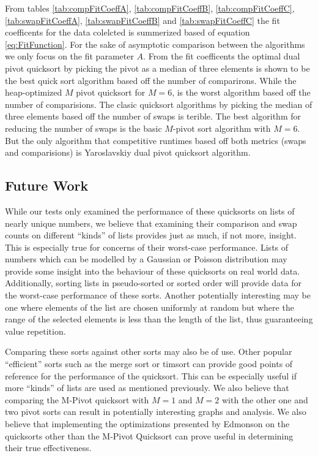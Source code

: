 		From tables \ref{tab:compFitCoeffA}, \ref{tab:compFitCoeffB}, \ref{tab:compFitCoeffC}, \ref{tab:swapFitCoeffA}, \ref{tab:swapFitCoeffB} and \ref{tab:swapFitCoeffC} the fit coefficents for the data colelcted is summerized based of equation \ref{eq:FitFunction}. For the sake of asymptotic comparison between the algorithms we only focus on the fit parameter $A$. From the fit coefficents the optimal dual pivot quicksort by picking the pivot as a median of three elements is shown to be the best quick sort algorithm based off the number of comparirons. While the heap-optimized $M$ pivot quicksort for $M=6$, is the worst algorithm based off the number of comparisions. The clasic quicksort algorithms by picking the median of three elements based off the number of swaps is terible. The best algorithm for reducing the number of swaps is the basic $M$-pivot sort algorithm with $M=6$. But the only algorithm that competitive runtimes based off both metrics (swaps and comparisions) is Yaroslavskiy dual pivot quicksort algorithm.
		

	\subsection{Future Work}
		\label{subsec:FutureStuff}
		While our tests only examined the performance of these quicksorts on lists of nearly unique numbers, we believe that examining their comparison and swap counts on different ``kinds'' of lists provides just as much, if not more, insight. This is especially true for concerns of their worst-case performance. Lists of numbers which can be modelled by a Gaussian or Poisson distribution may provide some insight into the behaviour of these quicksorts on real world data. Additionally, sorting lists in pseudo-sorted or sorted order will provide data for the worst-case performance of these sorts. Another potentially interesting may be one where elements of the list are chosen uniformly at random but where the range of the selected elements is less than the length of the list, thus guaranteeing value repetition. 

		Comparing these sorts against other sorts may also be of use. Other popular ``efficient'' sorts such as the merge sort or timsort can provide good points of reference for the performance of the quicksort. This can be especially useful if more ``kinds'' of lists are used as mentioned previously. We also believe that comparing the M-Pivot quicksort with $M=1$ and $M=2$ with the other one and two pivot sorts can result in potentially interesting graphs and analysis. We also believe that implementing the optimizations presented by Edmonson \cite{edmondson2005m} on the quicksorts other than the M-Pivot Quicksort can prove useful in determining their true effectiveness.


